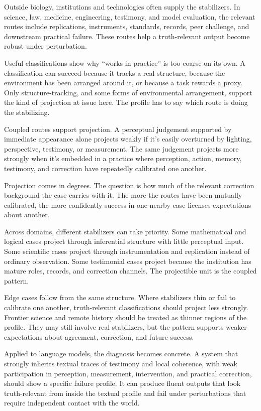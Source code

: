 \documentclass[12pt]{article}
\begin{document}
Outside biology, institutions and technologies often supply the stabilizers. In science,
law, medicine, engineering, testimony, and model evaluation, the relevant routes include
replications, instruments, standards, records, peer challenge, and downstream practical
failure. These routes help a truth-relevant output become robust under perturbation.

Useful classifications show why \enquote{works in practice} is too coarse on its own. A
classification can succeed because it tracks a real structure, because the environment
has been arranged around it, or because a task rewards a proxy. Only structure-tracking,
and some forms of environmental arrangement, support the kind of projection at issue
here. The profile has to say which route is doing the stabilizing.

Coupled routes support projection. A perceptual judgement
supported by immediate appearance alone projects weakly if it's easily overturned by
lighting, perspective, testimony, or measurement. The same judgement projects more
strongly when it's embedded in a practice where perception, action, memory, testimony,
and correction have repeatedly calibrated one another.

Projection comes in degrees. The question is how much of the relevant correction
background the case carries with it. The more the routes have been mutually calibrated,
the more confidently success in one nearby case licenses expectations about another.

Across domains, different stabilizers can take priority. Some mathematical and logical cases
project through inferential structure with little perceptual input. Some scientific cases
project through instrumentation and replication instead of ordinary observation. Some
testimonial cases project because the institution has mature roles, records, and
correction channels. The projectible unit is the coupled pattern.

Edge cases follow from the same structure. Where stabilizers thin or fail to calibrate one
another, truth-relevant classifications should project less strongly.
Frontier science and remote history should
be treated as thinner regions of the profile. They may still involve real stabilizers,
but the pattern supports weaker expectations about agreement, correction, and future
success.

Applied to language models, the diagnosis becomes concrete. A system that strongly inherits textual
traces of testimony and local coherence, with weak participation in perception,
measurement, intervention, and practical correction, should show a specific failure
profile. It can produce fluent outputs that look truth-relevant from inside the textual
profile and fail under perturbations that require independent contact with the world.
\end{document}

